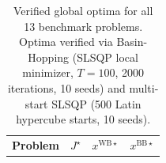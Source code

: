 \documentclass[12pt,a4paper]{article}%
\theoremstyle{plain}%
\theoremstyle{remark}%
\theoremstyle{definition}%
\def\WB{\mathrm{WB}}
\def\BB{\mathrm{BB}}
\providecommand{\DIFaddbegin}{} %
\providecommand{\DIFdelbegin}{} %
\providecommand{\DIFdelend}{} %
\newcommand{\DIFscaledelfig}{0.5}
\newlength{\DIFdelgraphicswidth} %
\newlength{\DIFdelgraphicsheight} %
\newcommand{\DIFaddincludegraphics}[2][]{{\color{blue}\fbox{\DIFOincludegraphics[#1]{#2}}}} %
\newcommand{\DIFdelincludegraphics}[2][]{%
\sbox{\DIFdelgraphicsbox}{\DIFOincludegraphics[#1]{#2}}%
\settoboxwidth{\DIFdelgraphicswidth}{\DIFdelgraphicsbox} %
\settoboxtotalheight{\DIFdelgraphicsheight}{\DIFdelgraphicsbox} %
\scalebox{\DIFscaledelfig}{%
\parbox[b]{\DIFdelgraphicswidth}{\usebox{\DIFdelgraphicsbox}\\[-\baselineskip] \rule{\DIFdelgraphicswidth}{0em}}\llap{\resizebox{\DIFdelgraphicswidth}{\DIFdelgraphicsheight}{%
\setlength{\unitlength}{\DIFdelgraphicswidth}%
\begin{picture}(1,1)%
\thicklines\linethickness{2pt} %
{\color[rgb]{1,0,0}\put(0,0){\framebox(1,1){}}}%
{\color[rgb]{1,0,0}\put(0,0){\line( 1,1){1}}}%
{\color[rgb]{1,0,0}\put(0,1){\line(1,-1){1}}}%
\end{picture}%
}\hspace*{3pt}}} %
} %
\DeclareRobustCommand{\DIFaddbegin}{\DIFOaddbegin \let\includegraphics\DIFaddincludegraphics} %
\DeclareRobustCommand{\DIFdelbegin}{\DIFOdelbegin \let\includegraphics\DIFdelincludegraphics} %
\DeclareRobustCommand{\DIFdelend}{\DIFOaddend \let\includegraphics\DIFOincludegraphics} %
\begin{document}
\begin{appendices}
\DIFdelbegin %
\DIFdelend \DIFaddbegin \begin{table}[htbp]
\centering
\caption{Verified global optima for all 13 benchmark problems. Optima verified via Basin-Hopping (SLSQP local minimizer, $T=100$, 2000 iterations, 10 seeds) and multi-start SLSQP (500 Latin hypercube starts, 10 seeds).}
\label{tab:verified_optima}
\begin{tabular}{@{}lrll@{}}
\toprule
\textbf{Problem} & $J^\star$ & $x^{\WB\star}$ & $x^{\BB\star}$ \\

\end{tabular}
\end{table}
\end{appendices}
\end{document}
